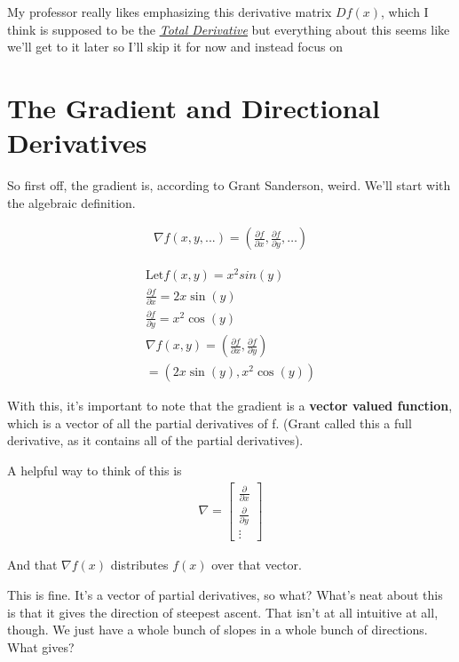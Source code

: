 \documentclass[12pt, letterpaper]{article}
\newcommand{\externalLink}[2]{\emph{\underline{\href{#1}{#2}}}}
\begin{document}
My professor really likes emphasizing this derivative matrix $Df(x)$, which I think is supposed to be the \externalLink{https://en.wikipedia.org/wiki/Total_derivative}{Total Derivative} but everything about this seems like we'll get to it later so I'll skip it for now and instead focus on

\section{The Gradient and Directional Derivatives}
So first off, the gradient is, according to Grant Sanderson, weird. We'll start with the algebraic definition.

\begin{gather*}
    \nabla f(x, y, ...) = (\frac{\partial f}{\partial x}, \frac{\partial f}{\partial y}, \dots)
\end{gather*}

\begin{gather*}
    \text{Let} f(x, y) = x^2 sin(y)\\
    \frac{\partial f}{\partial x} = 2x\sin(y) \\
    \frac{\partial f}{\partial y} = x^2\cos(y) \\
    \nabla f(x, y) = (\frac{\partial f}{\partial x}, \frac{\partial f}{\partial y}) \\
    = (2x\sin(y), x^2\cos(y))
\end{gather*}

With this, it's important to note that the gradient is a \textbf{vector valued function}, which is a vector of all the partial derivatives of f. (Grant called this a full derivative, as it contains all of the partial derivatives).

A helpful way to think of this is
\begin{gather*}
    \nabla = \begin{bmatrix}
        \frac{\partial}{\partial x}\\
        \frac{\partial}{\partial y}\\
        \vdots
    \end{bmatrix}
\end{gather*}

And that $\nabla f(x)$ distributes $f(x)$ over that vector.

This is fine. It's a vector of partial derivatives, so what? What's neat about this is that it gives the direction of steepest ascent. That isn't at all intuitive at all, though. We just have a whole bunch of slopes in a whole bunch of directions. What gives?
\end{document}
